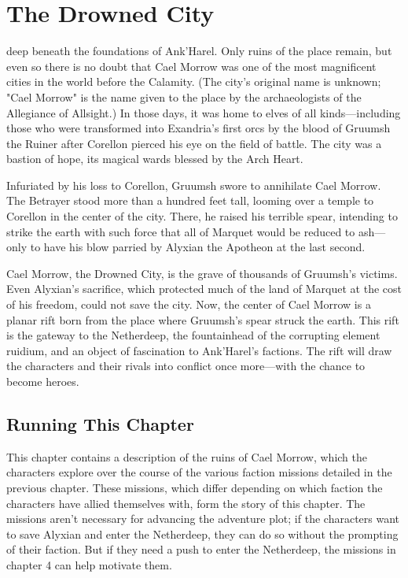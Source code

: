 \documentclass[10pt,a4paper,twoside,twocolumn,openany,nodeprecatedcode]{dndbook}
\begin{document}
\chapter{The Drowned City}
 deep beneath the foundations of Ank'Harel. Only ruins of the place remain, but even so there is no doubt that Cael Morrow was one of the most magnificent cities in the world before the Calamity. (The city's original name is unknown; "Cael Morrow" is the name given to the place by the archaeologists of the Allegiance of Allsight.) In those days, it was home to elves of all kinds—including those who were transformed into Exandria's first orcs by the blood of Gruumsh the Ruiner after Corellon pierced his eye on the field of battle. The city was a bastion of hope, its magical wards blessed by the Arch Heart.


Infuriated by his loss to Corellon, Gruumsh swore to annihilate Cael Morrow. The Betrayer stood more than a hundred feet tall, looming over a temple to Corellon in the center of the city. There, he raised his terrible spear, intending to strike the earth with such force that all of Marquet would be reduced to ash—only to have his blow parried by Alyxian the Apotheon at the last second.

Cael Morrow, the Drowned City, is the grave of thousands of Gruumsh's victims. Even Alyxian's sacrifice, which protected much of the land of Marquet at the cost of his freedom, could not save the city. Now, the center of Cael Morrow is a planar rift born from the place where Gruumsh's spear struck the earth. This rift is the gateway to the Netherdeep, the fountainhead of the corrupting element ruidium, and an object of fascination to Ank'Harel's factions. The rift will draw the characters and their rivals into conflict once more—with the chance to become heroes.

\section{Running This Chapter}
This chapter contains a description of the ruins of Cael Morrow, which the characters explore over the course of the various faction missions detailed in the previous chapter. These missions, which differ depending on which faction the characters have allied themselves with, form the story of this chapter. The missions aren't necessary for advancing the adventure plot; if the characters want to save Alyxian and enter the Netherdeep, they can do so without the prompting of their faction. But if they need a push to enter the Netherdeep, the missions in chapter 4 can help motivate them.
\end{document}
